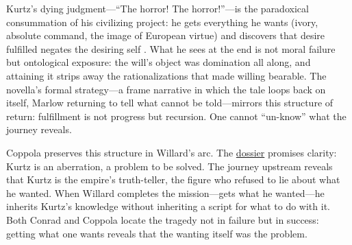 Kurtz's dying judgment---``The horror! The horror!''---is the paradoxical consummation of his
civilizing project: he gets everything he wants (ivory, absolute command, the image of European
virtue) and discovers that desire fulfilled negates the desiring self \parencite{ConradHOD1990}.
What he sees at the end is not moral failure but ontological exposure: the will's object was
domination all along, and attaining it strips away the rationalizations that made willing
bearable. The novella's formal strategy---a frame narrative in which the tale loops back on
itself, Marlow returning to tell what cannot be told—mirrors this structure of return:
fulfillment is not progress but recursion. One cannot ``un-know'' what the journey reveals.

Coppola preserves this structure in Willard's arc. The \hyperref[scene:briefing]{dossier}
promises clarity: Kurtz is an aberration, a problem to be solved. The journey upstream reveals
that Kurtz is the empire's truth-teller, the figure who refused to lie about what he wanted.
When Willard completes the mission—gets what he wanted—he inherits Kurtz's knowledge without
inheriting a script for what
to do with it. Both Conrad and Coppola locate the tragedy not in failure but in success:
getting what one wants reveals that the wanting itself was the problem.
